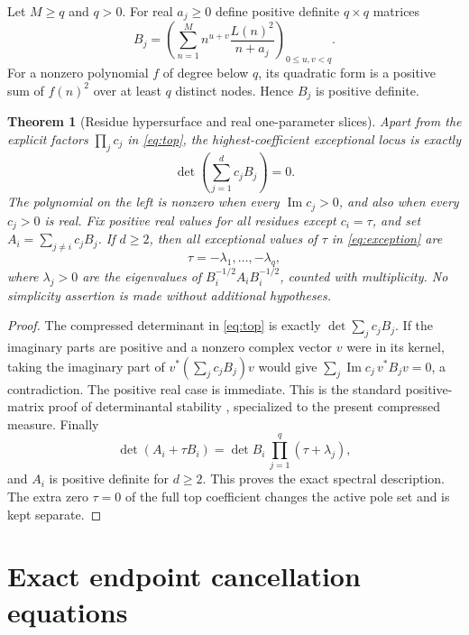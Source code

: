 \documentclass[11pt,letterpaper]{article}
\numberwithin{equation}{section}
\newtheorem{theorem}{Theorem}[section]
\theoremstyle{definition}\newtheorem{definition}[theorem]{Definition}
\theoremstyle{remark}\newtheorem{remark}[theorem]{Remark}
\begin{document}
Let $M\ge q$ and $q>0$. For real $a_j\ge0$ define positive definite
$q\times q$ matrices
\begin{equation}\label{eq:Bres}
 B_j=\left(\sum_{n=1}^M
             n^{u+v}\frac{L(n)^2}{n+a_j}\right)_{0\le u,v<q}.
\end{equation}
For a nonzero polynomial $f$ of degree below $q$, its quadratic form
is a positive sum of $f(n)^2$ over at least $q$ distinct nodes. Hence
$B_j$ is positive definite.

\begin{theorem}[Residue hypersurface and real one-parameter slices]
\label{thm:stability}
Apart from the explicit factors $\prod_jc_j$ in \eqref{eq:top}, the
highest-coefficient exceptional locus is exactly
\begin{equation}\label{eq:exception}
           \det\left(\sum_{j=1}^d c_jB_j\right)=0.
\end{equation}
The polynomial on the left is nonzero when every $\operatorname{Im}c_j>0$,
and also when every $c_j>0$ is real. Fix positive real values for all
residues except $c_i=\tau$, and set
$A_i=\sum_{j\ne i}c_jB_j$. If $d\ge2$, then all exceptional values
of $\tau$ in \eqref{eq:exception} are
\begin{equation}\label{eq:roots}
                  \tau=-\lambda_1,\ldots,-\lambda_q,
\end{equation}
where $\lambda_j>0$ are the eigenvalues of
$B_i^{-1/2}A_iB_i^{-1/2}$, counted with multiplicity. No simplicity
assertion is made without additional hypotheses.
\end{theorem}
\begin{proof}
The compressed determinant in \eqref{eq:top} is exactly
$\det\sum_jc_jB_j$. If the imaginary parts are positive and a nonzero
complex vector $v$ were in its kernel, taking the imaginary part of
$v^*(\sum_jc_jB_j)v$ would give
$\sum_j\operatorname{Im}c_j\,v^*B_jv=0$, a contradiction. The positive
real case is immediate. This is the standard positive-matrix proof
of determinantal stability \cite{borcea}, specialized to the present
compressed measure. Finally
\[
 \det(A_i+\tau B_i)=\det B_i\,
                  \prod_{j=1}^q(\tau+\lambda_j),
\]
and $A_i$ is positive definite for $d\ge2$. This proves the exact
spectral description. The extra zero $\tau=0$ of the full top
coefficient changes the active pole set and is kept separate.
\end{proof}

\section{Exact endpoint cancellation equations}
\label{sec:endpoints}
\end{document}
